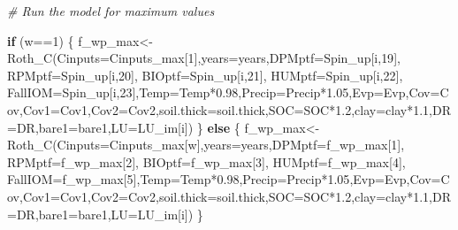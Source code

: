 \documentclass[
  10pt,
  b5paper,
]{book}
\newenvironment{Shaded}{\begin{snugshade}}{\end{snugshade}}
\newcommand{\AttributeTok}[1]{\textcolor[rgb]{0.77,0.63,0.00}{#1}}
\newcommand{\CommentTok}[1]{\textcolor[rgb]{0.56,0.35,0.01}{\textit{#1}}}
\newcommand{\ControlFlowTok}[1]{\textcolor[rgb]{0.13,0.29,0.53}{\textbf{#1}}}
\newcommand{\DecValTok}[1]{\textcolor[rgb]{0.00,0.00,0.81}{#1}}
\newcommand{\FloatTok}[1]{\textcolor[rgb]{0.00,0.00,0.81}{#1}}
\newcommand{\FunctionTok}[1]{\textcolor[rgb]{0.00,0.00,0.00}{#1}}
\newcommand{\NormalTok}[1]{#1}
\newcommand{\OtherTok}[1]{\textcolor[rgb]{0.56,0.35,0.01}{#1}}
\newcommand{\SpecialCharTok}[1]{\textcolor[rgb]{0.00,0.00,0.00}{#1}}
\begin{document}
\begin{Shaded}
\begin{Highlighting}[]
\CommentTok{\# Run the model for maximum values}

\ControlFlowTok{if}\NormalTok{ (w}\SpecialCharTok{==}\DecValTok{1}\NormalTok{) \{}
\NormalTok{f\_wp\_max}\OtherTok{\textless{}{-}}\FunctionTok{Roth\_C}\NormalTok{(}\AttributeTok{Cinputs=}\NormalTok{Cinputs\_max[}\DecValTok{1}\NormalTok{],}\AttributeTok{years=}\NormalTok{years,}\AttributeTok{DPMptf=}\NormalTok{Spin\_up[i,}\DecValTok{19}\NormalTok{], }\AttributeTok{RPMptf=}\NormalTok{Spin\_up[i,}\DecValTok{20}\NormalTok{], }\AttributeTok{BIOptf=}\NormalTok{Spin\_up[i,}\DecValTok{21}\NormalTok{], }\AttributeTok{HUMptf=}\NormalTok{Spin\_up[i,}\DecValTok{22}\NormalTok{], }\AttributeTok{FallIOM=}\NormalTok{Spin\_up[i,}\DecValTok{23}\NormalTok{],}\AttributeTok{Temp=}\NormalTok{Temp}\SpecialCharTok{*}\FloatTok{0.98}\NormalTok{,}\AttributeTok{Precip=}\NormalTok{Precip}\SpecialCharTok{*}\FloatTok{1.05}\NormalTok{,}\AttributeTok{Evp=}\NormalTok{Evp,}\AttributeTok{Cov=}\NormalTok{Cov,}\AttributeTok{Cov1=}\NormalTok{Cov1,}\AttributeTok{Cov2=}\NormalTok{Cov2,}\AttributeTok{soil.thick=}\NormalTok{soil.thick,}\AttributeTok{SOC=}\NormalTok{SOC}\SpecialCharTok{*}\FloatTok{1.2}\NormalTok{,}\AttributeTok{clay=}\NormalTok{clay}\SpecialCharTok{*}\FloatTok{1.1}\NormalTok{,}\AttributeTok{DR=}\NormalTok{DR,}\AttributeTok{bare1=}\NormalTok{bare1,}\AttributeTok{LU=}\NormalTok{LU\_im[i])}
\NormalTok{\} }\ControlFlowTok{else}\NormalTok{ \{}
\NormalTok{f\_wp\_max}\OtherTok{\textless{}{-}}\FunctionTok{Roth\_C}\NormalTok{(}\AttributeTok{Cinputs=}\NormalTok{Cinputs\_max[w],}\AttributeTok{years=}\NormalTok{years,}\AttributeTok{DPMptf=}\NormalTok{f\_wp\_max[}\DecValTok{1}\NormalTok{], }\AttributeTok{RPMptf=}\NormalTok{f\_wp\_max[}\DecValTok{2}\NormalTok{], }\AttributeTok{BIOptf=}\NormalTok{f\_wp\_max[}\DecValTok{3}\NormalTok{], }\AttributeTok{HUMptf=}\NormalTok{f\_wp\_max[}\DecValTok{4}\NormalTok{], }\AttributeTok{FallIOM=}\NormalTok{f\_wp\_max[}\DecValTok{5}\NormalTok{],}\AttributeTok{Temp=}\NormalTok{Temp}\SpecialCharTok{*}\FloatTok{0.98}\NormalTok{,}\AttributeTok{Precip=}\NormalTok{Precip}\SpecialCharTok{*}\FloatTok{1.05}\NormalTok{,}\AttributeTok{Evp=}\NormalTok{Evp,}\AttributeTok{Cov=}\NormalTok{Cov,}\AttributeTok{Cov1=}\NormalTok{Cov1,}\AttributeTok{Cov2=}\NormalTok{Cov2,}\AttributeTok{soil.thick=}\NormalTok{soil.thick,}\AttributeTok{SOC=}\NormalTok{SOC}\SpecialCharTok{*}\FloatTok{1.2}\NormalTok{,}\AttributeTok{clay=}\NormalTok{clay}\SpecialCharTok{*}\FloatTok{1.1}\NormalTok{,}\AttributeTok{DR=}\NormalTok{DR,}\AttributeTok{bare1=}\NormalTok{bare1,}\AttributeTok{LU=}\NormalTok{LU\_im[i])}
\NormalTok{\}}


\end{Highlighting}
\end{Shaded}
\end{document}

